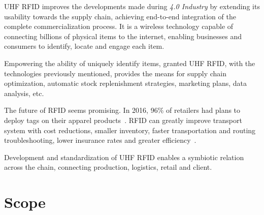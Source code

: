 \gls{UHF RFID} improves the developments made during \emph{4.0 Industry} by extending its usability towards the \gls{supply chain}, achieving end-to-end integration of the complete commercialization process. It is a wireless technology capable of connecting billions of physical items to the internet, enabling businesses and consumers to identify, locate and engage each item.


Empowering the ability of uniquely identify items, granted \gls{UHF RFID}, with the technologies previously mentioned, provides the means for \gls{supply chain} optimization, automatic stock replenishment strategies, marketing plans, data analysis, etc. 


The future of \gls{RFID} seems promising. In 2016, 96\% of retailers had plans to deploy tags on their apparel products~\cite{hardgrave2016StateRFID}. \gls{RFID} can greatly improve transport system with cost reductions, smaller inventory, faster transportation and routing troubleshooting, lower insurance rates and greater efficiency~\cite{oanaRFIDTechnologyContainers2013}.

Development and standardization of \gls{UHF RFID} enables a symbiotic relation across the chain, connecting production, logistics, retail and client.

\section{Scope}





